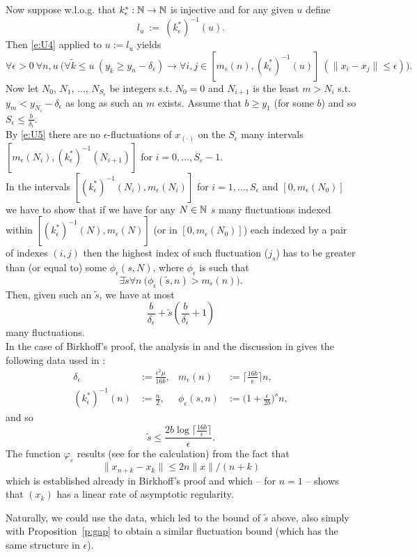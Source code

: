 Now suppose w.l.o.g. that $k^*_\epsilon:\mathbb{N}\to\mathbb{N}$ is injective and for any given $u$ define
\[
l_u\ :=\ (k^*_\epsilon)^{-1}(u).
\]
Then \eqref{e:U4} applied to $u:=l_u$ yields
\[
\forall \epsilon>0\ \forall n,u\ \Big( \forall \tilde k\le u\ 
(y_{\tilde k}\geq y_n-\delta_\epsilon)\rightarrow 
 \forall i,j\in[m_\epsilon(n),(k^*_\epsilon)^{-1}(u)]\ 
(\|x_i-x_j\|\leq \epsilon) \Big).
\tag{-}\label{e:U5}\]
Now let $N_0$, $N_1$, ..., $N_{S_\epsilon}$ be integers s.t. $N_0=0$ and $N_{i+1}$ is the least $m>N_i$ s.t. $y_m<y_{N_i}-\delta_\epsilon$ as long as such an $m$ exists.
Assume that $b\geq y_1$ (for some $b$) and so $S_\epsilon\leq\frac{b}{\delta_\epsilon}$.\\
By \eqref{e:U5} there are no $\epsilon$-fluctuations of $x_{(\cdot)}$ on the 
$S_\epsilon$ many intervals $[m_\epsilon(N_i),(k^*_\epsilon)^{-1}
(N_{i+1})]$ for $i=0,\ldots,S_{\varepsilon}-1$.\\
In the intervals $[(k^*_\epsilon)^{-1}(N_{i}),m_\epsilon(N_i)]$ 
for $i=1,\ldots,
S_\epsilon$ and $[0,m_\epsilon(N_0)]$ we have to show that if we have for 
any $N\in\mathbb{N}$ $s$ many
fluctuations indexed within $[(k^*_\epsilon)^{-1}(N),m_\epsilon(N)]$ 
(or in $[0,m_\epsilon(N_0)]$) each indexed by a pair of indexes $(i,j)$ 
then the highest index of such fluctuation ($j_s$) has to be greater than 
(or equal to) some $\phi_\epsilon(s,N)$, where $\phi_\epsilon$ is such that
\[
\exists \tilde s\forall n\ \big(\phi_\epsilon(\tilde s,n)>m_\epsilon(n)\big).
\]
Then, given such an $\tilde s$, we have at most
\[
\frac{b}{\delta_\epsilon}+\tilde s\left(\frac{b}{\delta_\epsilon}+1\right)
\]
many fluctuations.
\\[2mm]
In the case of Birkhoff's proof, the analysis in \cite{kohlenbachleustean09} 
and the discussion in \cite{Avigad/Rute} 
gives the following data used in \cite{Avigad/Rute}: 
\begin{align*}
\delta_\epsilon &:= \frac{\epsilon^2\mu}{16b},& m_\epsilon(n)&:=\big\lceil \frac{16b}{\epsilon}\big\rceil n,\\
(k^*_\epsilon)^{-1}(n)&:=\frac{n}{2},& 
\phi_\epsilon(s,n)&:=\big(1+ \frac{\epsilon}{2b}\big)^s n,
\end{align*}
and so \[ \tilde s \leq \frac{ 2 b\log \big\lceil 
\frac{16b}{\epsilon}\big\rceil }{\epsilon}.\]
The function $\varphi_{\varepsilon}$ results (see \cite{Avigad/Rute} for 
the calculation) from the fact that 
\[ \| x_ {n+k}-x_k\|\le 2n\| x\|/(n+k) \]
which is established already in Birkhoff's proof and which -- for $n=1$ -- 
shows that $(x_k)$ has a linear rate of asymptotic regularity.
\begin{rmk}
Naturally, we could use the data, which led to the bound 
of $\tilde s$ above, also simply with Proposition~\ref{p:gap} to
obtain a similar fluctuation bound (which has the same structure in $\epsilon$).
\end{rmk}

